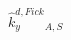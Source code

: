 \documentclass[border=2pt]{standalone}
\begin{document}
${{\hat{k}^{d,Fick}_y}}{_{A, S}}$
\end{document}
